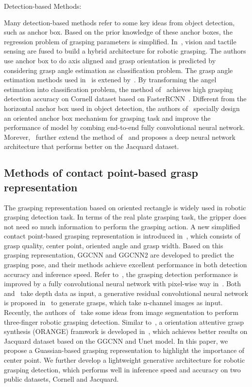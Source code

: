 \documentclass[journal]{IEEEtran}
\begin{document}
\begin{bfseries}
	\label{detection}
	Detection-based Methods:
\end{bfseries} 
Many detection-based methods refer to some key ideas from object detection, such as anchor box. Based on the prior knowledge of these anchor boxes, the regression problem of grasping parameters is simplified. In~\cite{guo}, vision and tactile sensing are fused to build a hybrid architecture for robotic grasping. The authors use anchor box to do axis aligned and grasp orientation is predicted by considering grasp angle estimation as classification problem. The grasp angle estimation methods used in~\cite{guo} is extened by~\cite{chu}. By transforming the angel estimation into classification problem, the method of~\cite{chu} achieves high grasping detection accuracy on Cornell dataset based on FasterRCNN~\cite{fasterrcnn}. Different from the horizontal anchor box used in object detection, the authors of~\cite{zhou} specially design an oriented anchor box mechanism for grasping task and improve the performance of model by combing end-to-end fully convolutional neural network. Morever,~\cite{jacquard} further extend the method of~\cite{zhou} and proposes a deep neural network architecture that performs better on the Jacquard dataset.


\subsection{Methods of contact point-based grasp representation}
\label{representation}
The grasping representation based on oriented rectangle is widely used in robotic grasping detection task. In terms of the real plate grasping task, the gripper does not need so much information to perform the grasping action. A new simplified contact point-based grasping representation is introduced in~\cite{ggcnn}, which consists of grasp quality, center point, oriented angle and grasp width. Based on this grasping representation, GGCNN and GGCNN2 are developed to predict the grasping pose, and their methods achieve excellent performance in both detection accuracy and inference speed. Refer to~\cite{ggcnn}, the grasping detection performance is improved by a fully convolutional neural network with pixel-wise way in~\cite{hri}. Both~\cite{ggcnn} and~\cite{hri} take depth data as input, a generative residual convolutional neural network is proposed in~\cite{kumra} to generate grasps, which take n-channel images as input. Recently, the authors of~\cite{sgdn} take some ideas from image segmentation to perform three-finger robotic grasping detection. Similar to~\cite{sgdn}, a orientation attentive grasp synthesis (ORANGE) framwork is developed in~\cite{orange}, which achieves better results on Jacquard dataset based on the GGCNN and Unet model. In this paper, we propose a Guassian-based grasping representation to highlight the importance of center point. We further develop a lightweight generative architecture for robotic grasping detection, which performs well in inference speed and accuracy on two public datasets, Cornell and Jacquard.
\end{document}
